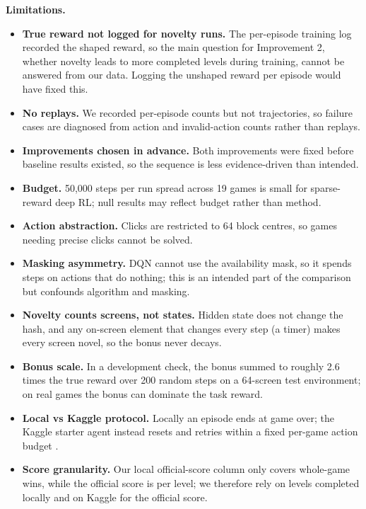 \documentclass[10pt]{article}
\begin{document}
\textbf{Limitations.}
\begin{itemize}
    \item \textbf{True reward not logged for novelty runs.} The per-episode training log recorded the shaped reward, so the main question for Improvement 2, whether novelty leads to more completed levels during training, cannot be answered from our data. Logging the unshaped reward per episode would have fixed this.
    \item \textbf{No replays.} We recorded per-episode counts but not trajectories, so failure cases are diagnosed from action and invalid-action counts rather than replays.
    \item \textbf{Improvements chosen in advance.} Both improvements were fixed before baseline results existed, so the sequence is less evidence-driven than intended.
    \item \textbf{Budget.} 50,000 steps per run spread across 19 games is small for sparse-reward deep RL; null results may reflect budget rather than method.
    \item \textbf{Action abstraction.} Clicks are restricted to 64 block centres, so games needing precise clicks cannot be solved.
    \item \textbf{Masking asymmetry.} DQN cannot use the availability mask, so it spends steps on actions that do nothing; this is an intended part of the comparison but confounds algorithm and masking.
    \item \textbf{Novelty counts screens, not states.} Hidden state does not change the hash, and any on-screen element that changes every step (a timer) makes every screen novel, so the bonus never decays.
    \item \textbf{Bonus scale.} In a development check, the bonus summed to roughly 2.6 times the true reward over 200 random steps on a 64-screen test environment; on real games the bonus can dominate the task reward.
    \item \textbf{Local vs Kaggle protocol.} Locally an episode ends at game over; the Kaggle starter agent instead resets and retries within a fixed per-game action budget \citep{arcstarterkit2026}.
    \item \textbf{Score granularity.} Our local official-score column only covers whole-game wins, while the official score is per level; we therefore rely on levels completed locally and on Kaggle for the official score.
\end{itemize}

\end{document}
